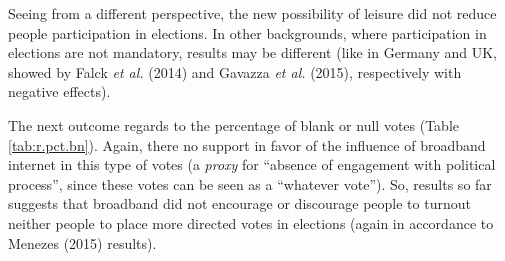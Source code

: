 \documentclass[
  12pt,
]{article}
\begin{document}
Seeing from a different perspective, the new possibility of leisure did
not reduce people participation in elections. In other backgrounds,
where participation in elections are not mandatory, results may be
different (like in Germany and UK, showed by Falck \emph{et al.} (2014)
and Gavazza \emph{et al.} (2015), respectively with negative effects).

The next outcome regards to the percentage of blank or null votes (Table
\ref{tab:r.pct.bn}). Again, there no support in favor of the influence
of broadband internet in this type of votes (a \emph{proxy} for
``absence of engagement with political process'', since these votes can
be seen as a ``whatever vote''). So, results so far suggests that
broadband did not encourage or discourage people to turnout neither
people to place more directed votes in elections (again in accordance to
Menezes (2015) results).
\end{document}
